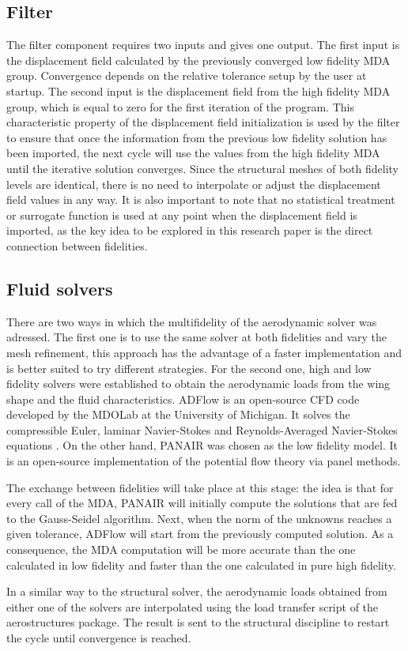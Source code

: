 \documentclass[conf]{new-aiaa}
\begin{document}
\subsection{Filter}
The filter component requires two inputs and gives one output. The first input is the displacement field calculated by the previously converged low fidelity MDA group. Convergence depends on the relative tolerance setup by the user at startup. The second input is the displacement field from the high fidelity MDA group, which is equal to zero for the first iteration of the program. This characteristic property of the displacement field initialization is used by the filter to ensure that once the information from the previous low fidelity solution has been imported, the next cycle will use the values from the high fidelity MDA until the iterative solution converges. Since the structural meshes of both fidelity levels are identical, there is no need to interpolate or adjust the displacement field values in any way. It is also important to note that no statistical treatment or surrogate function is used at any point when the displacement field is imported, as the key idea to be explored in this research paper is the direct connection between fidelities. 

\subsection{Fluid solvers}
There are two ways in which the multifidelity of the aerodynamic solver was adressed. The first one is to use the same solver at both fidelities and vary the mesh refinement, this approach has the advantage of a faster implementation and is better suited to try different strategies. For the second one, high and low fidelity solvers were established to obtain the aerodynamic loads from the wing shape and the fluid characteristics. ADFlow is an open-source CFD code developed by the MDOLab at the University of Michigan. It solves the compressible Euler, laminar Navier-Stokes and Reynolds-Averaged Navier-Stokes equations \cite{lyu2013automatic}. On the other hand, PANAIR \cite{carmichael1981pan} was chosen as the low fidelity model. It is an open-source implementation of the potential flow theory via panel methods. \par The exchange between fidelities will take place at this stage: the idea is that for every call of the MDA, PANAIR will initially compute the solutions that are fed to the Gauss-Seidel algorithm. Next, when the norm of the unknowns reaches a given tolerance, ADFlow will start from the previously computed solution. As a consequence, the MDA computation will be more accurate than the one calculated in low fidelity and faster than the one calculated in pure high fidelity. \par 
In a similar way to the structural solver, the aerodynamic loads obtained from either one of the solvers are interpolated using the load transfer script of the aerostructures package. The result is sent to the structural discipline to restart the cycle until convergence is reached. 
\end{document}
